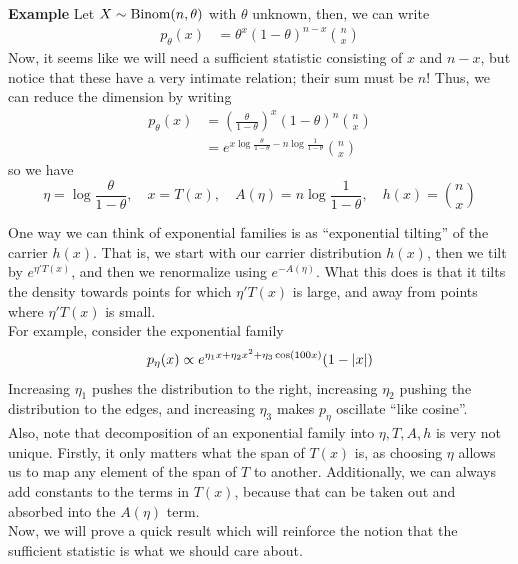 \begin{example}{\textbf{Example}}
    Let $X \sim \text{Binom}(n, \theta)$ with $\theta$ unknown, then, we can write
    \begin{align*}
        p_{\theta}(x) &= \theta^x(1 - \theta)^{n - x}{n \choose x}
    \end{align*}
    Now, it seems like we will need a sufficient statistic consisting of $x$ and $n - x$, but notice that these have a very intimate relation; their sum must be $n$! Thus, we can reduce the dimension by writing
    \begin{align*}
        p_{\theta}(x) &= \left(\frac{\theta}{1 - \theta}\right)^{x}(1 - \theta)^{n}{n \choose x}\\
        &= e^{x\log\frac{\theta}{1-\theta} - n\log\frac{1}{1 - \theta}}{n \choose x}
    \end{align*}
    so we have
    \[ \eta = \log\frac{\theta}{1 - \theta},\quad x = T(x),\quad A(\eta) = n\log\frac{1}{1 - \theta},\quad h(x) = {n\choose x} \]
\end{example}

One way we can think of exponential families is as ``exponential tilting'' of the carrier $h(x)$. That is, we start with our carrier distribution $h(x)$, then we tilt by $e^{\eta'T(x)}$, and then we renormalize using $e^{-A(\eta)}$. What this does is that it tilts the density towards points for which $\eta'T(x)$ is large, and away from points where $\eta'T(x)$ is small.\\

For example, consider the exponential family
\[ p_{\eta}(x) \propto e^{\eta_1x + \eta_2x^2 + \eta_3\cos(100x)}(1 - \left\lvert {x} \right\rvert) \]
Increasing $\eta_1$ pushes the distribution to the right, increasing $\eta_2$ pushing the distribution to the edges, and increasing $\eta_3$ makes $p_{\eta}$ oscillate ``like cosine''.\\

Also, note that decomposition of an exponential family into $\eta, T, A, h$ is very not unique. Firstly, it only matters what the span of $T(x)$ is, as choosing $\eta$ allows us to map any element of the span of $T$ to another. Additionally, we can always add constants to the terms in $T(x)$, because that can be taken out and absorbed into the $A(\eta)$ term.\\

Now, we will prove a quick result which will reinforce the notion that the sufficient statistic is what we should care about.

